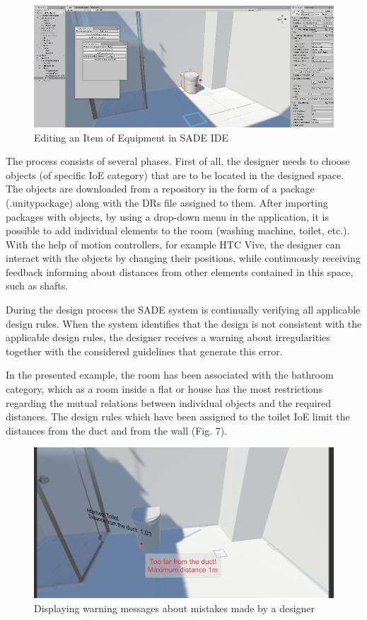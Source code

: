 \documentclass[runningheads]{llncs}
\begin{document}
\begin{figure}[]
\centering
\includegraphics[width=\textwidth, height=4.55cm]{editor4.png}
\caption{Editing an Item of Equipment in SADE IDE} \label{fig6}
\end{figure}

The process consists of several phases. First of all, the designer needs to choose objects (of specific IoE category) that are to be located in the designed space. The objects are downloaded from a repository in the form of a package (.unitypackage) along with the DRs file assigned to them. After importing packages with objects, by using a drop-down menu in the application, it is possible to add individual elements to the room (washing machine, toilet, etc.). With the help of motion controllers, for example HTC Vive, the designer can interact with the objects by changing their positions, while continuously receiving feedback informing about distances from other elements contained in this space, such as shafts. 

During the design process the SADE system is continually verifying all applicable design rules. When the system identifies that the design is not consistent with the applicable design rules, the designer receives a warning about irregularities together with the considered guidelines that generate this error.

In the presented example, the room has been associated with the bathroom category, which as a room inside a flat or house has the most restrictions regarding the mutual relations between individual objects and the required distances. The design rules which have been assigned to the toilet IoE limit the distances from the duct and from the wall (Fig. 7).


\begin{figure}[]
\centering
\includegraphics[width=\textwidth]{aplikacja3.png}
\caption{Displaying warning messages about mistakes made by a designer} \label{fig8}
\end{figure}
\end{document}
